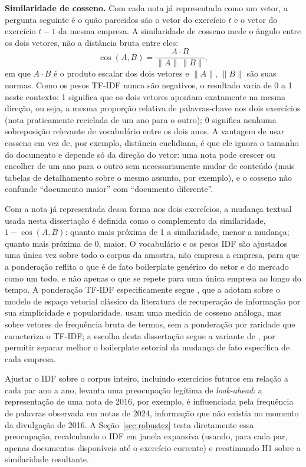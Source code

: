 \documentclass[a4paper,12pt]{report}
\begin{document}
\textbf{Similaridade de cosseno.} Com cada nota já representada como um vetor, a pergunta seguinte é o quão parecidos são o vetor do exercício $t$ e o vetor do exercício $t-1$ da mesma empresa. A similaridade de cosseno mede o ângulo entre os dois vetores, não a distância bruta entre eles:
\begin{equation}
    \cos(A,B) = \frac{A \cdot B}{\lVert A \rVert \, \lVert B \rVert},
    \label{eq:cosseno}
\end{equation}
em que $A \cdot B$ é o produto escalar dos dois vetores e $\lVert A \rVert$, $\lVert B \rVert$ são suas normas. Como os pesos TF-IDF nunca são negativos, o resultado varia de 0 a 1 neste contexto: 1 significa que os dois vetores apontam exatamente na mesma direção, ou seja, a mesma proporção relativa de palavras-chave nos dois exercícios (nota praticamente reciclada de um ano para o outro); 0 significa nenhuma sobreposição relevante de vocabulário entre os dois anos. A vantagem de usar cosseno em vez de, por exemplo, distância euclidiana, é que ele ignora o tamanho do documento e depende só da direção do vetor: uma nota pode crescer ou encolher de um ano para o outro sem necessariamente mudar de conteúdo (mais tabelas de detalhamento sobre o mesmo assunto, por exemplo), e o cosseno não confunde ``documento maior'' com ``documento diferente''.

Com a nota já representada dessa forma nos dois exercícios, a mudança textual usada nesta dissertação é definida como o complemento da similaridade, $1 - \cos(A,B)$: quanto mais próxima de 1 a similaridade, menor a mudança; quanto mais próxima de 0, maior. O vocabulário e os pesos IDF são ajustados uma única vez sobre todo o corpus da amostra, não empresa a empresa, para que a ponderação reflita o que é de fato boilerplate genérico do setor e do mercado como um todo, e não apenas o que se repete para uma única empresa ao longo do tempo. A ponderação TF-IDF especificamente segue , que a adotam sobre o modelo de espaço vetorial clássico da literatura de recuperação de informação por sua simplicidade e popularidade.  usam uma medida de cosseno análoga, mas sobre vetores de frequência bruta de termos, sem a ponderação por raridade que caracteriza o TF-IDF; a escolha desta dissertação segue a variante de , por permitir separar melhor o boilerplate setorial da mudança de fato específica de cada empresa.

Ajustar o IDF sobre o corpus inteiro, incluindo exercícios futuros em relação a cada par ano a ano, levanta uma preocupação legítima de \textit{look-ahead}: a representação de uma nota de 2016, por exemplo, é influenciada pela frequência de palavras observada em notas de 2024, informação que não existia no momento da divulgação de 2016. A Seção~\ref{sec:robustez} testa diretamente essa preocupação, recalculando o IDF em janela expansiva (usando, para cada par, apenas documentos disponíveis até o exercício corrente) e reestimando H1 sobre a similaridade resultante.
\end{document}
